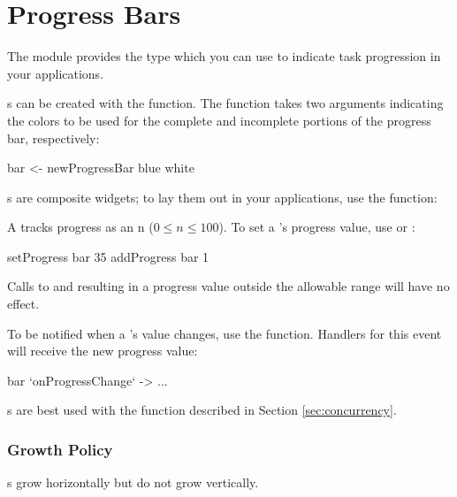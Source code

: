 \section{Progress Bars}
\label{sec:progress_bars}

The  module provides the  type which
you can use to indicate task progression in your applications.

s can be created with the 
function.  The function takes two  arguments indicating the
colors to be used for the complete and incomplete portions of the
progress bar, respectively:

\begin{haskellcode}
 bar <- newProgressBar blue white
\end{haskellcode}

s are composite widgets; to lay them out in your
applications, use the  function:


A  tracks progress as an  n ($0 \le n $).  To set a 's progress value, use
 or :

\begin{haskellcode}
 setProgress bar 35
 addProgress bar 1
\end{haskellcode}

Calls to  and  resulting in a progress
value outside the allowable range will have no effect.

To be notified when a 's value changes, use the
 function.  Handlers for this event will receive
the new progress value:

\begin{haskellcode}
 bar `onProgressChange` \newVal -> ...
\end{haskellcode}

s are best used with the  function
described in Section \ref{sec:concurrency}.

\subsubsection{Growth Policy}

s grow horizontally but do not grow vertically.
